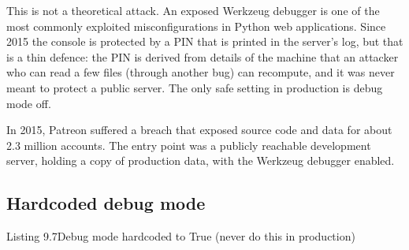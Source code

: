 \begin{codebox}[short]

\begin{Shaded}
\begin{Highlighting}[]
\OperatorTok{;}\NormalTok{)  }
\OperatorTok{;}\NormalTok{)  }
\OperatorTok{;}\NormalTok{)  }
\end{Highlighting}
\end{Shaded}

\end{codebox}

\noindent{}This is not a theoretical attack. An exposed Werkzeug debugger is one of the most commonly exploited misconfigurations in Python web applications. Since 2015 the console is protected by a PIN that is printed in the server's log, but that is a thin defence: the PIN is derived from details of the machine that an attacker who can read a few files (through another bug) can recompute, and it was never meant to protect a public server. The only safe setting in production is debug mode off.

In 2015, Patreon suffered a breach that exposed source code and data for about 2.3 million accounts. The entry point was a publicly reachable development server, holding a copy of production data, with the Werkzeug debugger enabled.

\subsection*{Hardcoded debug mode}\label{09-configuration-coupling:hardcoded-debug-mode}

\begin{codeboxcap}[short]{\textcolor{accent}{Listing 9.7}\enspace Debug mode hardcoded to True (never do this in production)}

\begin{Shaded}
\begin{Highlighting}[]
\OperatorTok{=}\NormalTok{)}
\end{Highlighting}
\end{Shaded}

\end{codeboxcap}

